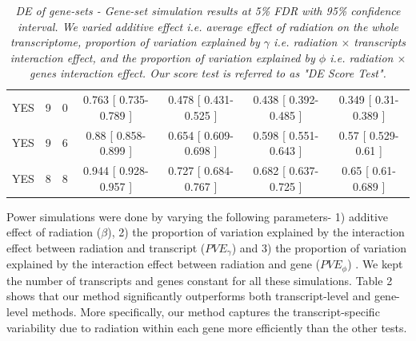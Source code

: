 \documentclass[hidelinks,11pt]{article}
\begin{document}
\begin{table}[!ht]
\begin{center}
{\begin{tabular}{| c | c | c | c | c | c | c |}
YES & 9 & 0 & 0.763 [ 0.735-0.789 ] &  0.478 [ 0.431-0.525 ] &  0.438 [ 0.392-0.485 ] &  0.349 [ 0.31-0.389 ] \\
YES & 9 & 6 & 0.88 [ 0.858-0.899 ] &  0.654 [ 0.609-0.698 ] &  0.598 [ 0.551-0.643 ] &  0.57 [ 0.529-0.61 ] \\
YES & 8 & 8 & 0.944 [ 0.928-0.957 ] &  0.727 [ 0.684-0.767 ] &  0.682 [ 0.637-0.725 ] &  0.65 [ 0.61-0.689 ] \\
\hline \hline
\end{tabular}
}
\label{table:design}
\end{center}
\caption{\emph{DE of gene-sets - Gene-set simulation results at 5\% FDR with 95\% confidence interval. We varied additive effect i.e. average effect of radiation on the whole transcriptome, proportion of variation explained by $\gamma$ i.e. radiation $\times$ transcripts interaction effect, and the proportion of variation explained by $\phi$ i.e. radiation $\times$ genes interaction effect. Our score test is referred to as "DE Score Test".}}
\end{table}

Power simulations were done by varying the following parameters- 1) additive effect of radiation ($\beta$), 2) the proportion of variation explained by the interaction effect between radiation and transcript ($PVE_\gamma$) and 3) the proportion of variation explained by the interaction effect between radiation and gene ($PVE_\phi$) . We kept the number of transcripts and genes constant for all these simulations. Table 2 shows that our method significantly outperforms both transcript-level and gene-level methods. More specifically, our method captures the transcript-specific variability due to radiation within each gene more efficiently than the other tests. 
\end{document}
